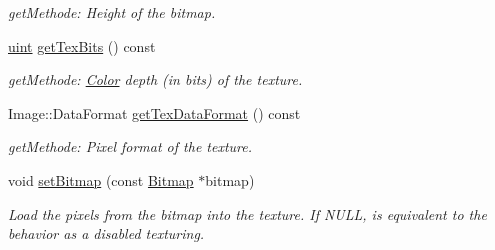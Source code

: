 \begin{DoxyCompactItemize}
\begin{DoxyCompactList}\small\item\em getMethode: Height of the bitmap. \item\end{DoxyCompactList}\item 
\hypertarget{class_f2_c_1_1_sprite_base_a1c2bcccea45cbe282628b7c7e43cd93c}{
\hyperlink{namespace_f2_c_a58be2bac9eb3e3c99cb41b6008bf4fae}{uint} \hyperlink{class_f2_c_1_1_sprite_base_a1c2bcccea45cbe282628b7c7e43cd93c}{getTexBits} () const }
\label{class_f2_c_1_1_sprite_base_a1c2bcccea45cbe282628b7c7e43cd93c}

\begin{DoxyCompactList}\small\item\em getMethode: \hyperlink{class_f2_c_1_1_color}{Color} depth (in bits) of the texture. \item\end{DoxyCompactList}\item 
\hypertarget{class_f2_c_1_1_sprite_base_ab5746d99d97e67289b493a6c022fdb58}{
Image::DataFormat \hyperlink{class_f2_c_1_1_sprite_base_ab5746d99d97e67289b493a6c022fdb58}{getTexDataFormat} () const }
\label{class_f2_c_1_1_sprite_base_ab5746d99d97e67289b493a6c022fdb58}

\begin{DoxyCompactList}\small\item\em getMethode: Pixel format of the texture. \item\end{DoxyCompactList}\item 
void \hyperlink{class_f2_c_1_1_sprite_base_a94df734d094880352b1dc517a9332faa}{setBitmap} (const \hyperlink{class_f2_c_1_1_bitmap}{Bitmap} $\ast$bitmap)
\begin{DoxyCompactList}\small\item\em Load the pixels from the bitmap into the texture. If NULL, is equivalent to the behavior as a disabled texturing. \item\end{DoxyCompactList}\end{DoxyCompactItemize}
